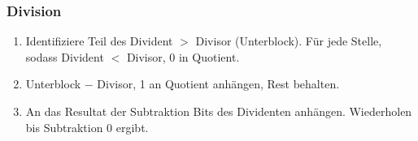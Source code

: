 \subsubsection{Division}
\begin{enumerate}
    \item Identifiziere Teil des Divident $>$ Divisor (Unterblock). Für jede Stelle, sodass Divident $<$ Divisor, 0 in Quotient.
    \item Unterblock $-$ Divisor, 1 an Quotient anhängen, Rest behalten.
    \item An das Resultat der Subtraktion Bits des Dividenten anhängen. Wiederholen bis Subtraktion 0 ergibt.
\end{enumerate}